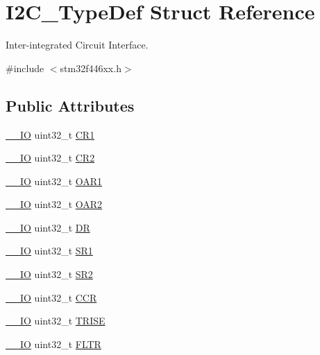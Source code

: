 \hypertarget{struct_i2_c___type_def}{}\section{I2\+C\+\_\+\+Type\+Def Struct Reference}
\label{struct_i2_c___type_def}


Inter-\/integrated Circuit Interface.  




{\ttfamily \#include $<$stm32f446xx.\+h$>$}

\subsection*{Public Attributes}
\begin{DoxyCompactItemize}
\item 
\hyperlink{core__sc300_8h_aec43007d9998a0a0e01faede4133d6be}{\+\_\+\+\_\+\+IO} uint32\+\_\+t \hyperlink{struct_i2_c___type_def_a91782f7b81475b0e3c3779273abd26aa}{C\+R1}
\item 
\hyperlink{core__sc300_8h_aec43007d9998a0a0e01faede4133d6be}{\+\_\+\+\_\+\+IO} uint32\+\_\+t \hyperlink{struct_i2_c___type_def_a29eb47db03d5ad7e9b399f8895f1768c}{C\+R2}
\item 
\hyperlink{core__sc300_8h_aec43007d9998a0a0e01faede4133d6be}{\+\_\+\+\_\+\+IO} uint32\+\_\+t \hyperlink{struct_i2_c___type_def_ae8269169fcbdc2ecb580208d99c2f89f}{O\+A\+R1}
\item 
\hyperlink{core__sc300_8h_aec43007d9998a0a0e01faede4133d6be}{\+\_\+\+\_\+\+IO} uint32\+\_\+t \hyperlink{struct_i2_c___type_def_a73988a218be320999c74a641b3d6e3c1}{O\+A\+R2}
\item 
\hyperlink{core__sc300_8h_aec43007d9998a0a0e01faede4133d6be}{\+\_\+\+\_\+\+IO} uint32\+\_\+t \hyperlink{struct_i2_c___type_def_a5c1beaa4935359da1c8f0ceb287f90be}{DR}
\item 
\hyperlink{core__sc300_8h_aec43007d9998a0a0e01faede4133d6be}{\+\_\+\+\_\+\+IO} uint32\+\_\+t \hyperlink{struct_i2_c___type_def_a639be124227c03bb3f5fe0e7faf84995}{S\+R1}
\item 
\hyperlink{core__sc300_8h_aec43007d9998a0a0e01faede4133d6be}{\+\_\+\+\_\+\+IO} uint32\+\_\+t \hyperlink{struct_i2_c___type_def_ac509048af4b9ac67c808d584fdbc712e}{S\+R2}
\item 
\hyperlink{core__sc300_8h_aec43007d9998a0a0e01faede4133d6be}{\+\_\+\+\_\+\+IO} uint32\+\_\+t \hyperlink{struct_i2_c___type_def_a4d81b61d23a54d0d1e28646c3bb9aac5}{C\+CR}
\item 
\hyperlink{core__sc300_8h_aec43007d9998a0a0e01faede4133d6be}{\+\_\+\+\_\+\+IO} uint32\+\_\+t \hyperlink{struct_i2_c___type_def_a9f1a5aee4a26b2fb30e08f88586c436d}{T\+R\+I\+SE}
\item 
\hyperlink{core__sc300_8h_aec43007d9998a0a0e01faede4133d6be}{\+\_\+\+\_\+\+IO} uint32\+\_\+t \hyperlink{struct_i2_c___type_def_a6b540b18ea0370e3e45f69902343320c}{F\+L\+TR}
\end{DoxyCompactItemize}


